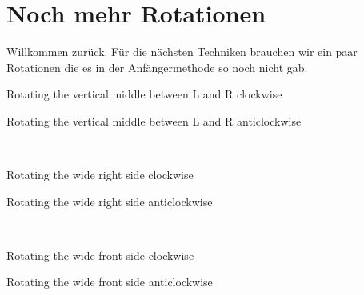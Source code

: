 \section{Noch mehr Rotationen}
Willkommen zurück. Für die nächsten Techniken brauchen wir ein paar Rotationen 
die es in der Anfängermethode so noch nicht gab. \\[1em]

\begin{instruction}{Rotating the vertical middle between L and R clockwise}
  \vspace{1.3em}
  \RubikCubeSolved%
  \quad{}
\end{instruction}
\hfil
\begin{instruction}{Rotating the vertical middle between L and R anticlockwise}
  \vspace{1.3em}
  \RubikCubeSolved%
  \quad{}
\end{instruction}\\[5em]
\begin{instruction}{Rotating the wide right side clockwise}
  \vspace{1.3em}
  \RubikCubeSolved%
  \quad{}
\end{instruction}
\hfil
\begin{instruction}{Rotating the wide right side anticlockwise}
  \vspace{1.3em}
  \RubikCubeSolved%
  \quad{}
\end{instruction}\\[5em]
\begin{instruction}{Rotating the wide front side clockwise}
  \vspace{1.3em}
  \RubikCubeSolved%
  \quad{}
\end{instruction}
\hfil
\begin{instruction}{Rotating the wide front side anticlockwise}
  \vspace{1.3em}
  \RubikCubeSolved%
  \quad{}
\end{instruction}\\[5em]
